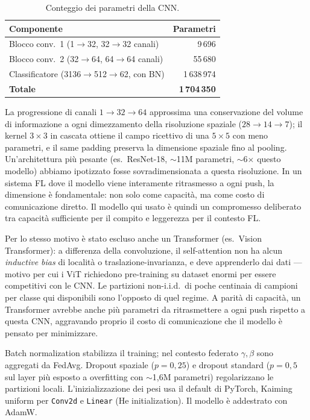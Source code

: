 \begin{table}[t]
  \centering
  \caption{Conteggio dei parametri della CNN.}
  \label{tab:model}
  \footnotesize
  \begin{tabular}{lr}
    \toprule
    \textbf{Componente} & \textbf{Parametri} \\
    \midrule
    Blocco conv.\ 1 (1$\to$32, 32$\to$32 canali) & 9\,696 \\
    Blocco conv.\ 2 (32$\to$64, 64$\to$64 canali) & 55\,680 \\
    Classificatore (3136$\to$512$\to$62, con BN) & 1\,638\,974 \\
    \midrule
    \textbf{Totale} & \textbf{1\,704\,350} \\
    \bottomrule
  \end{tabular}
\end{table}

La progressione di canali $1\to32\to64$ approssima una conservazione del volume
di informazione a ogni dimezzamento della risoluzione spaziale
($28\to14\to7$); il kernel $3\times3$ in cascata ottiene il
campo ricettivo di una $5\times5$ con meno parametri, e il same padding
preserva la dimensione spaziale fino al pooling. Un'architettura più pesante
(es.\ ResNet-18, $\sim$11M parametri, $\sim$6$\times$ questo modello) abbiamo ipotizzato fosse
sovradimensionata a questa risoluzione. In un sistema FL dove il modello
viene interamente ritrasmesso a ogni push, la dimensione è fondamentale:
non solo come capacità, ma come costo di comunicazione diretto. Il modello qui usato è quindi un compromesso deliberato tra
capacità sufficiente per il compito e leggerezza per il contesto FL.

Per lo stesso motivo è stato escluso anche un Transformer (es.\ Vision
Transformer): a differenza della convoluzione, il self-attention non ha
alcun \emph{inductive bias} di località o traslazione-invarianza, e deve
apprenderlo dai dati — motivo per cui i ViT richiedono pre-training su
dataset enormi per essere competitivi con le CNN. Le partizioni non-i.i.d.\
di poche centinaia di campioni per classe qui disponibili sono l'opposto
di quel regime. A parità di capacità, un Transformer avrebbe anche più
parametri da ritrasmettere a ogni push rispetto a questa CNN, aggravando
proprio il costo di comunicazione che il modello è pensato per minimizzare.

Batch normalization stabilizza il training; nel contesto federato $\gamma,\beta$ sono aggregati da FedAvg.
Dropout spaziale ($p=0{,}25$) e dropout standard ($p=0{,}5$ sul layer più esposto a
overfitting con $\sim$1,6M parametri) regolarizzano le partizioni locali.
L'inizializzazione dei pesi usa il default di PyTorch, Kaiming uniform per
\texttt{Conv2d} e \texttt{Linear} (He initialization). Il modello è addestrato con
AdamW.

